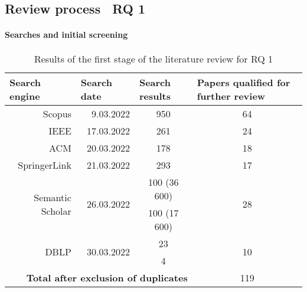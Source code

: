 \subsection{Review process \textendash\ RQ 1}\label{subsec:review-process-rq-1}

\paragraph{Searches and initial screening}

\begin{table}[]
    \centering
    \caption{Results of the first stage of the literature review for RQ 1}
    \begin{tabular}{@{}rrcc@{}}
        \toprule
        \multicolumn{1}{l}{\textbf{Search engine}} & \multicolumn{1}{l}{\textbf{Search date}} & \multicolumn{1}{l}{\textbf{Search results}} & \multicolumn{1}{l}{\textbf{Papers qualified for further review}} \\
        \midrule
        Scopus                            & 9.03.2022                   & 950          & 64                      \\
        IEEE                              & 17.03.2022                  & 261          & 24                      \\
        ACM                               & 20.03.2022                  & 178          & 18                      \\
        SpringerLink                      & 21.03.2022                  & 293          & 17                      \\
        \multirow{2}{*}{Semantic Scholar} & \multirow{2}{*}{26.03.2022} & 100 (36 600) & \multirow{2}{*}{28}     \\
                                          &                             & 100 (17 600) &                         \\
        \multirow{2}{*}{DBLP}             & \multirow{2}{*}{30.03.2022} & 23           & \multirow{2}{*}{10}     \\
                                          &                             & 4            &                         \\
        \midrule
        \multicolumn{3}{r}{\textbf{Total after exclusion of duplicates}}               & 119 \\
        \bottomrule
    \end{tabular}
    \label{tab:results-first-stage-review-rq-1}
\end{table}
